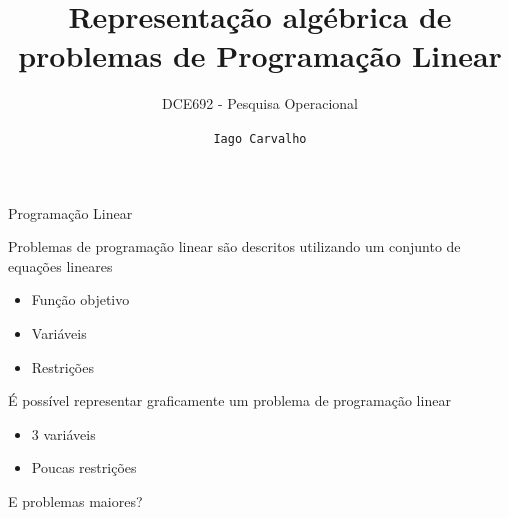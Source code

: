 \documentclass[compress,mathserif]{beamer}
\title{Representação algébrica de problemas de Programação Linear}
\subtitle{DCE692 - Pesquisa Operacional}
\author{\texttt{Iago Carvalho}}
\institute{\texttt{Departamento de Ciência da Computação}}
\begin{document}
\begin{frame}
\titlepage

\end{frame}


\begin{frame}{Programação Linear}

Problemas de programação linear são descritos utilizando um conjunto de equações lineares
\begin{itemize}
    \item Função objetivo
    \item Variáveis
    \item Restrições
\end{itemize}

\vspace{0.5cm}

É possível representar graficamente um problema de programação linear
\begin{itemize}
    \item 3 variáveis
    \item Poucas restrições
\end{itemize}

\vspace{0.5cm}

E problemas maiores?
\end{frame}

\end{document}
